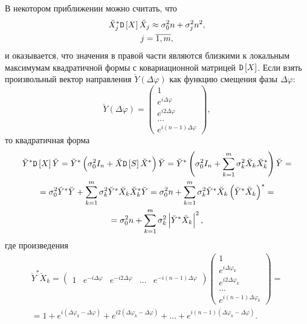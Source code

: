 В некотором приближении можно считать, что
\begin{gather*}
    \breve{X}_j^* \mathtt{D} \left [ X \right ] \breve{X}_j \approx \sigma_0^2 n + \sigma_j^2 n^2 , \\
    j = \overline{1,m} ,
\end{gather*}
и оказывается, что значения в правой части являются близкими к локальным максимумам квадратичной формы с
ковариационной матрицей $\mathtt{D} \left [ X \right ]$. Если взять произвольный вектор направления $\breve{Y}(\Delta \varphi)$ как функцию смещения фазы $\Delta \varphi$:
\[
    \breve{Y}(\Delta \varphi) =
    \begin{pmatrix}
        1                      \\
        e^{i \Delta \varphi}   \\
        e^{i 2 \Delta \varphi} \\
        \dots                  \\
        e^{i (n-1) \Delta \varphi}
    \end{pmatrix} ,
\]
то квадратичная форма
\begin{multline}
    \label{jammers:multiple:quadric}
    \breve{Y}^* \mathtt{D} \left [ X \right ] \breve{Y}
    = \breve{Y}^* \left( \sigma_0^2 I_n + \breve{X} \mathtt{D} \left [ S \right ] \breve{X}^* \right) \breve{Y}
    = \breve{Y}^* \left( \sigma_0^2 I_n + \sum_{k=1}^m \sigma_k^2 \breve{X}_k \breve{X}_k^* \right) \breve{Y} = \\
    = \sigma_0^2 \breve{Y}^* \breve{Y} + \sum_{k=1}^m \sigma_k^2 \breve{Y}^* \breve{X}_k \breve{X}_k^* \breve{Y}
    = \sigma_0^2 n + \sum_{k=1}^m \sigma_k^2 \breve{Y}^* \breve{X}_k \left( \breve{Y}^* \breve{X}_k \right)^* = \\
    = \sigma_0^2 n + \sum_{k=1}^m \sigma_k^2 \left | \breve{Y}^* \breve{X}_k \right |^2 ,
\end{multline}
где произведения
\begin{multline*}
    \breve{Y}^* \breve{X}_k
    =
    \begin{pmatrix}
        1                       &
        e^{- i \Delta \varphi}   &
        e^{- i 2 \Delta \varphi} &
        \dots                   &
        e^{- i (n-1) \Delta \varphi}
    \end{pmatrix}
    \begin{pmatrix}
        1                        \\
        e^{i \Delta \varphi_k}   \\
        e^{i 2 \Delta \varphi_k} \\
        \dots                    \\
        e^{i (n-1) \Delta \varphi_k}
    \end{pmatrix}
    = \\
    = 1 + e^{i (\Delta \varphi_k - \Delta \varphi )} + e^{i 2 (\Delta \varphi_k - \Delta \varphi )} + \dots + e^{i (n-1) (\Delta \varphi_k - \Delta \varphi )} .
\end{multline*}
